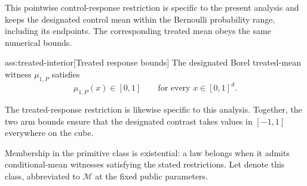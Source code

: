 \documentclass[11pt]{article}
\begin{document}
This pointwise control-response restriction is specific to the present analysis and keeps the designated control mean within the Bernoulli probability range, including its endpoints. The corresponding treated mean obeys the same numerical bounds.

\begin{assumptionv}{ass:treated-interior}[Treated response bounds]
The designated Borel treated-mean witness \(\mu_{1,P}\) satisfies
\[
\mu_{1,P}(x)\in[0,1]
\qquad\text{for every }x\in[0,1]^d.
\]
\end{assumptionv}

The treated-response restriction is likewise specific to this analysis. Together, the two arm bounds ensure that the designated contrast takes values in \([-1,1]\) everywhere on the cube.

Membership in the primitive class is existential: a law belongs when it admits conditional-mean witnesses satisfying the stated restrictions. Let  denote this class, abbreviated to \(\mathcal M\) at the fixed public parameters.
\end{document}
